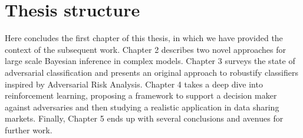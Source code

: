 \section{Thesis structure}

Here concludes the first chapter of this thesis, in which we have provided the context of the subsequent work. Chapter 2 describes two novel approaches for large scale Bayesian inference in complex models. Chapter 3 surveys the state of adversarial classification and presents an original approach to robustify classifiers inspired by Adversarial Risk Analysis. Chapter 4 takes a deep dive into reinforcement learning, proposing a framework to support a decision maker against adversaries and then studying a realistic application in data sharing markets.
Finally, Chapter 5 ends up with several conclusions and avenues for further work.